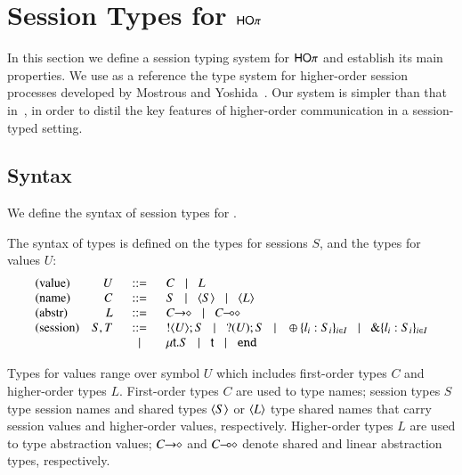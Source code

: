 \section{Session Types for $\mathsf{HO}\pi$}
\label{sec:types}

In this section we define a session typing system for
$\mathsf{HO}\pi$ and establish its main properties. We use as
a reference the type system for higher-order session processes 
developed by Mostrous and Yoshida~\cite{tlca07,mostrous09sessionbased}.
Our system is simpler than that in~\cite{tlca07}, in order to distil the key
features of higher-order communication in a session-typed setting.


\subsection{Syntax}

We define the syntax of session types for \HOp.

\begin{definition}\rm
	\label{def:types}
	The syntax of types is defined on the types for sessions $S$,
	and the types for values $U$:
	\[
	\begin{array}{lrcl}
		\textrm{(value)} & U & \bnfis &		C \bnfbar L 
		\\

		\textrm{(name)} & C & \bnfis &	S \bnfbar \chtype{S} \bnfbar \chtype{L}
		\\

		\textrm{(abstr)} & L & \bnfis &	\shot{C} \bnfbar \lhot{C}
		\\

		\textrm{(session)} & S,T & \bnfis & 	\btout{U} S \bnfbar \btinp{U} S
							\bnfbar \btsel{l_i:S_i}_{i \in I} \bnfbar \btbra{l_i:S_i}_{i \in I}\\
					&&\bnfbar&	\trec{t}{S} \bnfbar \vart{t}  \bnfbar \tinact
	\end{array}
	\]
\end{definition}
%
\noi {}
Types for values range over symbol $U$ which includes
first-order types $C$ and higher-order types $L$.
First-order types $C$ are used to type names;
session types $S$ type session names and shared types
$\langle S \rangle$ or $\langle L \rangle$ type shared names that
carry session values and higher-order values, respectively.
Higher-order types $L$ are used to type abstraction values;
$C\!\! \rightarrow\!\! \diamond$ and $C\!\! \multimap\!\! \diamond$ denote
shared and linear abstraction types, respectively.

